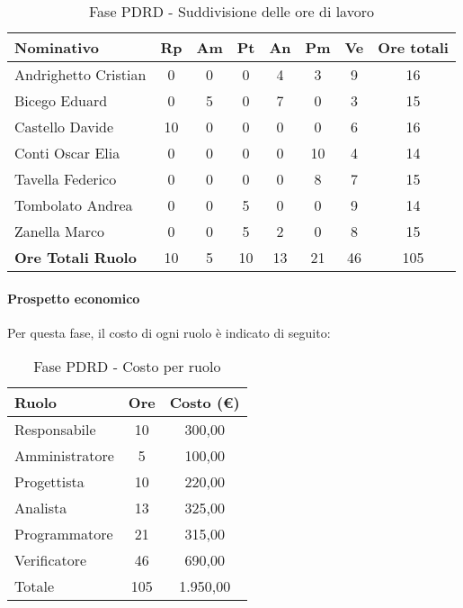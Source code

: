 \documentclass[../PianoProgetto.tex]{subfiles}
\begin{document}
	\begin{table}[h]
	
		\begin{tabularx}{\textwidth}{l  * {6}{C}  c}
			\toprule
			\textbf{Nominativo} & \textbf{Rp} & \textbf{Am} & \textbf{Pt} 
						& \textbf{An} & \textbf{Pm} & \textbf{Ve} & \textbf{Ore totali} \\
			\midrule
			Andrighetto Cristian & 0 & 0 & 0 & 4 & 3 & 9 & 16 \\
			Bicego Eduard & 0 & 5 &	0 &	7 &	0 &	3 &	15 \\
			Castello Davide & 10 & 0 & 0 & 0 & 0 & 6 & 16 \\
			Conti Oscar Elia & 0 & 0 & 0 & 0 & 10 &	4 &	14 \\
			Tavella Federico &	0 & 0 &	0 &	0 &	8 &	7 &	15 \\
			Tombolato Andrea & 0 & 0 & 5 & 0 & 0 & 9 & 14 \\
			Zanella Marco & 0 & 0 & 5 &	2 &	0 &	8 &	15 \\
			\midrule			
			\textbf{Ore Totali Ruolo} & 10 & 5 & 10 & 13 &	21 & 46 & 105 \\
			\bottomrule
		\end{tabularx}
		
		\caption{Fase PDRD - Suddivisione delle ore di lavoro}
		\label{tab:fasePDRD_ore}
		
	\end{table}
	
	\paragraph{Prospetto economico}
					Per questa fase, il costo di ogni ruolo è indicato di seguito:
					\begin{table}[h]
		\centering
	
		\begin{tabular}{l * {2}{c}}
			\toprule
			\textbf{Ruolo} & \textbf{Ore} & \textbf{Costo (\euro{})} \\
			\midrule
			Responsabile &	10 & 300,00 \\
			Amministratore & 5 & 100,00 \\
			Progettista & 10 & 220,00 \\
			Analista & 13 & 325,00 \\
			Programmatore & 21 & 315,00 \\
			Verificatore & 46 & 690,00 \\
			\midrule		
			Totale & 105 & 1.950,00 \\
			\bottomrule
		\end{tabular}
		
		\caption{Fase PDRD - Costo per ruolo}
		\label{tab:fasePDRD_costo}
		
	\end{table}
	
\end{document}
